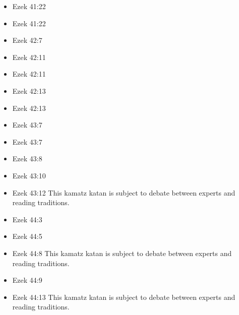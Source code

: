 \documentclass[14pt]{book}
\begin{document}
\begin{multicols}{2}
\begin{itemize}
														\item Ezek 41:22
														
														\item Ezek 41:22
														
														\item Ezek 42:7
														
														\item Ezek 42:11
														
														\item Ezek 42:11
														
														\item Ezek 42:13
														
														\item Ezek 42:13
														
														\item Ezek 43:7
														
														\item Ezek 43:7
														
														\item Ezek 43:8
														
														\item Ezek 43:10
														
														\item Ezek 43:12 This kamatz katan is subject to debate between experts and reading traditions.
														
														\item Ezek 44:3
														
														\item Ezek 44:5
														
														\item Ezek 44:8 This kamatz katan is subject to debate between experts and reading traditions.
														
														\item Ezek 44:9
														
														\item Ezek 44:13 This kamatz katan is subject to debate between experts and reading traditions.
														

\end{itemize}
\end{multicols}
\end{document}
